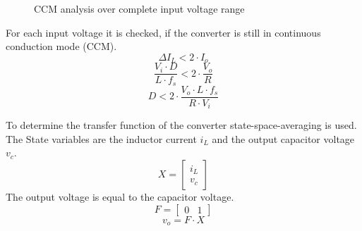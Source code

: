 \documentclass[a4paper,11pt,fleqn]{article}
\begin{document}
\begin{wrapfigure}{r}{0.5\textwidth}
    \centering
    \caption{CCM analysis over complete input voltage range}
    \label{fig_ccm}
\end{wrapfigure}

For each input voltage it is checked, if the converter is still in continuous 
conduction mode (CCM). 
\[ \Delta I_L < 2 \cdot I_o \]
\[ \dfrac{V_i \cdot D}{L \cdot f_s} < 2 \cdot \dfrac{V_o}{R} \]
\[ D < 2 \cdot \dfrac{V_o \cdot L \cdot f_s}{R \cdot V_i} \]

To determine the transfer function of the converter state-space-averaging is used. The State variables are the inductor current $i_L$ and the output capacitor voltage $v_c$. 
\[ X = \begin{bmatrix}i_L\\v_c\end{bmatrix} \]
The output voltage is equal to the capacitor voltage. 
\[ F = \begin{bmatrix}0 & 1\end{bmatrix} \]
\[ v_o = F \cdot X \]
\end{document}

